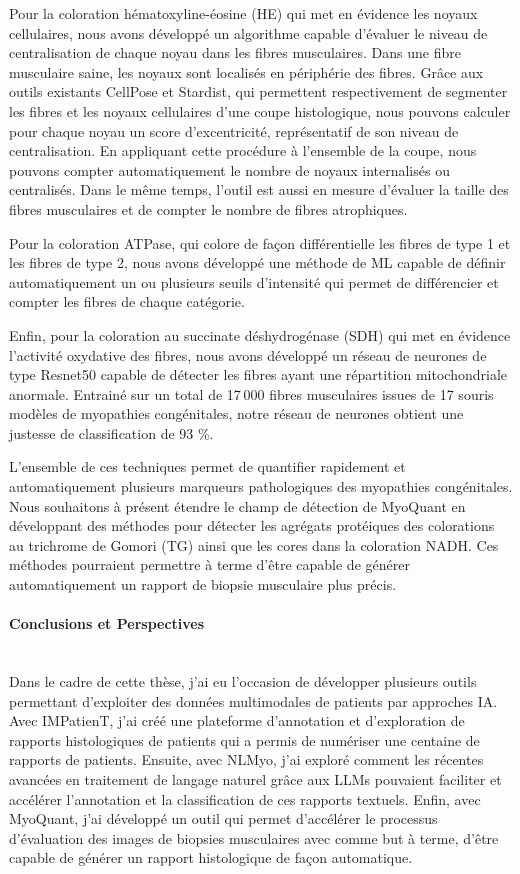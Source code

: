 Pour la coloration hématoxyline-éosine (HE) qui met en évidence les noyaux cellulaires, nous avons développé un algorithme capable d’évaluer le niveau de centralisation de chaque noyau dans les fibres musculaires. Dans une fibre musculaire saine, les noyaux sont localisés en périphérie des fibres. Grâce aux outils existants CellPose et Stardist, qui permettent respectivement de segmenter les fibres et les noyaux cellulaires d’une coupe histologique, nous pouvons calculer pour chaque noyau un score d’excentricité, représentatif de son niveau de centralisation. En appliquant cette procédure à l’ensemble de la coupe, nous pouvons compter automatiquement le nombre de noyaux internalisés ou centralisés. Dans le même temps, l’outil est aussi en mesure d’évaluer la taille des fibres musculaires et de compter le nombre de fibres atrophiques.

Pour la coloration ATPase, qui colore de façon différentielle les fibres de type 1 et les fibres de type 2, nous avons développé une méthode de ML capable de définir automatiquement un ou plusieurs seuils d’intensité qui permet de différencier et compter les fibres de chaque catégorie.

Enfin, pour la coloration au succinate déshydrogénase (SDH) qui met en évidence l’activité oxydative des fibres, nous avons développé un réseau de neurones de type Resnet50 capable de détecter les fibres ayant une répartition mitochondriale anormale. Entrainé sur un total de 17 000 fibres musculaires issues de 17 souris modèles de myopathies congénitales, notre réseau de neurones obtient une justesse de classification de 93 \%.

L’ensemble de ces techniques permet de quantifier rapidement et automatiquement plusieurs marqueurs pathologiques des myopathies congénitales. Nous souhaitons à présent étendre le champ de détection de MyoQuant en développant des méthodes pour détecter les agrégats protéiques des colorations au trichrome de Gomori (TG) ainsi que les cores dans la coloration NADH. Ces méthodes pourraient permettre à terme d’être capable de générer automatiquement un rapport de biopsie musculaire plus précis.

\paragraph{\textbf{Conclusions et Perspectives}}\mbox{}\\

Dans le cadre de cette thèse, j’ai eu l’occasion de développer plusieurs outils permettant d’exploiter des données multimodales de patients par approches IA. Avec IMPatienT, j’ai créé une plateforme d’annotation et d’exploration de rapports histologiques de patients qui a permis de numériser une centaine de rapports de patients. Ensuite, avec NLMyo, j’ai exploré comment les récentes avancées en traitement de langage naturel grâce aux LLMs pouvaient faciliter et accélérer l’annotation et la classification de ces rapports textuels. Enfin, avec MyoQuant, j’ai développé un outil qui permet d’accélérer le processus d’évaluation des images de biopsies musculaires avec comme but à terme, d’être capable de générer un rapport histologique de façon automatique.

